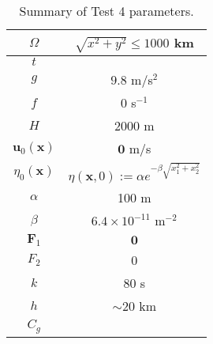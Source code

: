   \def\arraystretch{1.25} %
  \begin{table}[H]
    \begin{center}
      \begin{tabular}{|c|c|}
        \hline
        $\Omega$ & $\sqrt{x^2 + y^2} \le 1000$ km \\ \hline
        $t$ &  \\ \hline
        $g$ & $9.8$ m/s$^2$ \\ \hline 
        $f$ & 0 s$^{-1}$ \\ \hline
        $H$ & 2000 m \\ \hline
        $\mathbf{u}_0(\mathbf{x})$ & $\mathbf{0}$ m/s \\ \hline
        $\eta_0(\mathbf{x})$ & $\eta(\mathbf{x},0) := \alpha e^{-\beta
          \sqrt{x_1^2 + x_2^2}}$ \\ \hline
        $\alpha$ & 100 m \\ \hline
        $\beta$ & $6.4\times10^{-11}$ m$^{-2}$ \\ \hline
        $\mathbf{F}_1$ & $\mathbf{0}$ \\ \hline
        $F_2$ & 0 \\ \hline
        $k$ & 80 s \\ \hline
        $h$ & $\sim 20$ km \\ \hline
        $C_g$ & \\ \hline
      \end{tabular}
      \caption{Summary of Test 4 parameters.}
      \label{tab:GravityWaveParams}
    \end{center}
  \end{table}
